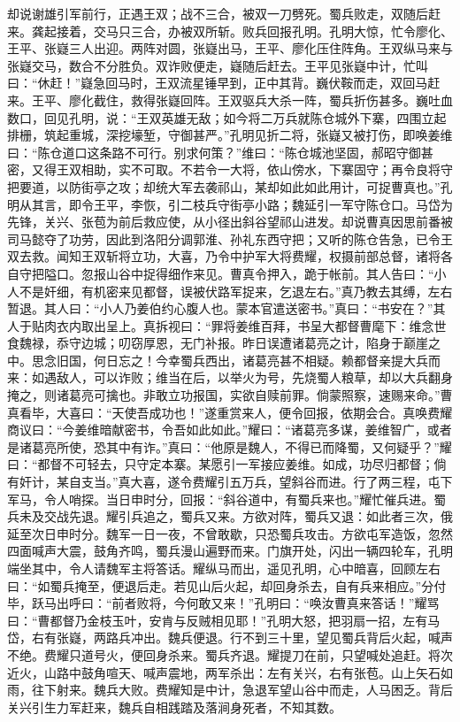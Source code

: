 却说谢雄引军前行，正遇王双；战不三合，被双一刀劈死。蜀兵败走，双随后赶来。龚起接着，交马只三合，办被双所斩。败兵回报孔明。孔明大惊，忙令廖化、王平、张嶷三人出迎。两阵对圆，张嶷出马，王平、廖化压住阵角。王双纵马来与张嶷交马，数合不分胜负。双诈败便走，嶷随后赶去。王平见张嶷中计，忙叫曰：“休赶！”嶷急回马时，王双流星锤早到，正中其背。巍伏鞍而走，双回马赶来。王平、廖化截住，救得张嶷回阵。王双驱兵大杀一阵，蜀兵折伤甚多。巍吐血数口，回见孔明，说：“王双英雄无敌；如今将二万兵就陈仓城外下寨，四围立起排栅，筑起重城，深挖壕堑，守御甚严。”孔明见折二将，张嶷又被打伤，即唤姜维曰：“陈仓道口这条路不可行。别求何策？”维曰：“陈仓城池坚固，郝昭守御甚密，又得王双相助，实不可取。不若令一大将，依山傍水，下寨固守；再令良将守把要道，以防街亭之攻；却统大军去袭祁山，某却如此如此用计，可捉曹真也。”孔明从其言，即令王平，李恢，引二枝兵守街亭小路；魏延引一军守陈仓口。马岱为先锋，关兴、张苞为前后救应使，从小径出斜谷望祁山进发。却说曹真因思前番被司马懿夺了功劳，因此到洛阳分调郭淮、孙礼东西守把；又听的陈仓告急，已令王双去救。闻知王双斩将立功，大喜，乃令中护军大将费耀，权摄前部总督，诸将各自守把隘口。忽报山谷中捉得细作来见。曹真令押入，跪于帐前。其人告曰：“小人不是奸细，有机密来见都督，误被伏路军捉来，乞退左右。”真乃教去其缚，左右暂退。其人曰：“小人乃姜伯约心腹人也。蒙本官遣送密书。”真曰：“书安在？”其人于贴肉衣内取出呈上。真拆视曰：“罪将姜维百拜，书呈大都督曹麾下：维念世食魏禄，忝守边城；叨窃厚恩，无门补报。昨日误遭诸葛亮之计，陷身于巅崖之中。思念旧国，何日忘之！今幸蜀兵西出，诸葛亮甚不相疑。赖都督亲提大兵而来：如遇敌人，可以诈败；维当在后，以举火为号，先烧蜀人粮草，却以大兵翻身掩之，则诸葛亮可擒也。非敢立功报国，实欲自赎前罪。倘蒙照察，速赐来命。”曹真看毕，大喜曰：“天使吾成功也！”遂重赏来人，便令回报，依期会合。真唤费耀商议曰：“今姜维暗献密书，令吾如此如此。”耀曰：“诸葛亮多谋，姜维智广，或者是诸葛亮所使，恐其中有诈。”真曰：“他原是魏人，不得已而降蜀，又何疑乎？”耀曰：“都督不可轻去，只守定本寨。某愿引一军接应姜维。如成，功尽归都督；倘有奸计，某自支当。”真大喜，遂令费耀引五万兵，望斜谷而进。行了两三程，屯下军马，令人哨探。当日申时分，回报：“斜谷道中，有蜀兵来也。”耀忙催兵进。蜀兵未及交战先退。耀引兵追之，蜀兵又来。方欲对阵，蜀兵又退：如此者三次，俄延至次日申时分。魏军一日一夜，不曾敢歇，只恐蜀兵攻击。方欲屯军造饭，忽然四面喊声大震，鼓角齐鸣，蜀兵漫山遍野而来。门旗开处，闪出一辆四轮车，孔明端坐其中，令人请魏军主将答话。耀纵马而出，遥见孔明，心中暗喜，回顾左右曰：“如蜀兵掩至，便退后走。若见山后火起，却回身杀去，自有兵来相应。”分付毕，跃马出呼曰：“前者败将，今何敢又来！”孔明曰：“唤汝曹真来答话！”耀骂曰：“曹都督乃金枝玉叶，安肯与反贼相见耶！”孔明大怒，把羽扇一招，左有马岱，右有张嶷，两路兵冲出。魏兵便退。行不到三十里，望见蜀兵背后火起，喊声不绝。费耀只道号火，便回身杀来。蜀兵齐退。耀提刀在前，只望喊处追赶。将次近火，山路中鼓角喧天、喊声震地，两军杀出：左有关兴，右有张苞。山上矢石如雨，往下射来。魏兵大败。费耀知是中计，急退军望山谷中而走，人马困乏。背后关兴引生力军赶来，魏兵自相践踏及落涧身死者，不知其数。

